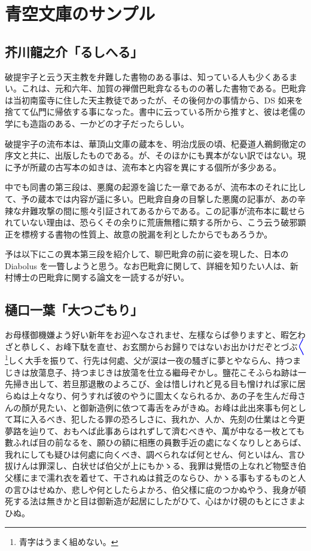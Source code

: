 \documentclass{ujreport}
\begin{document}
\chapter{青空文庫のサンプル}
\section{芥川龍之介「るしへる」}

破提宇子と云う天主教を弁難した書物のある事は、知っている人も少くあるまい。これは、元和六年、加賀の禅僧巴毗弇なるものの著した書物である。巴毗弇は当初南蛮寺に住した天主教徒であったが、その後何かの事情から、DS 如来を捨てて仏門に帰依する事になった。書中に云っている所から推すと、彼は老儒の学にも造詣のある、一かどの才子だったらしい。

破提宇子の流布本は、華頂山文庫の蔵本を、明治戊辰の頃、杞憂道人鵜飼徹定の序文と共に、出版したものである。が、そのほかにも異本がない訳ではない。現に予が所蔵の古写本の如きは、流布本と内容を異にする個所が多少ある。

中でも同書の第三段は、悪魔の起源を論じた一章であるが、流布本のそれに比して、予の蔵本では内容が遥に多い。巴毗弇自身の目撃した悪魔の記事が、あの辛辣な弁難攻撃の間に態々引証されてあるからである。この記事が流布本に載せられていない理由は、恐らくその余りに荒唐無稽に類する所から、こう云う破邪顕正を標榜する書物の性質上、故意の脱漏を利としたからでもあろうか。

予は以下にこの異本第三段を紹介して、聊巴毗弇の前に姿を現した、日本の Diabolus を一瞥しようと思う。なお巴毗弇に関して、詳細を知りたい人は、新村博士の巴毗弇に関する論文を一読するが好い。


\section{樋口一葉「大つごもり」}

お母樣御機嫌よう好い新年をお迎へなされませ、左樣ならば參りますと、暇乞わざと恭しく、お峰下駄を直せ、お玄關からお歸りではないお出かけだぞとづぶ\textcolor{blue}{〳〵}\footnote{青字はうまく組めない。}しく大手を振りて、行先は何處、父が涙は一夜の騷ぎに夢とやならん、持つまじきは放蕩息子、持つまじきは放蕩を仕立る繼母ぞかし。鹽花こそふらね跡は一先掃き出して、若旦那退散のよろこび、金は惜しけれど見る目も憎ければ家に居らぬは上々なり、何うすれば彼のやうに圖太くなられるか、あの子を生んだ母さんの顏が見たい、と御新造例に依つて毒舌をみがきぬ。お峰は此出來事も何として耳に入るべき、犯したる罪の恐ろしさに、我れか、人か、先刻の仕業はと今更夢路を辿りて、おもへば此事あらはれずして濟むべきや、萬が中なる一枚とても數ふれば目の前なるを、願ひの額に相應の員數手近の處になくなりしとあらば、我れにしても疑ひは何處に向くべき、調べられなば何とせん、何といはん、言ひ拔けんは罪深し、白状せば伯父が上にもかゝる、我罪は覺悟の上なれど物堅き伯父樣にまで濡れ衣を着せて、干されぬは貧乏のならひ、かゝる事もするものと人の言ひはせぬか、悲しや何としたらよかろ、伯父樣に疵のつかぬやう、我身が頓死する法は無きかと目は御新造が起居にしたがひて、心はかけ硯のもとにさまよひぬ。
\end{document}
